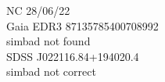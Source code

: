 NC 28/06/22\\
Gaia EDR3 87135785400708992\\
simbad not found\\

SDSS J022116.84+194020.4 \\
simbad not correct\\
